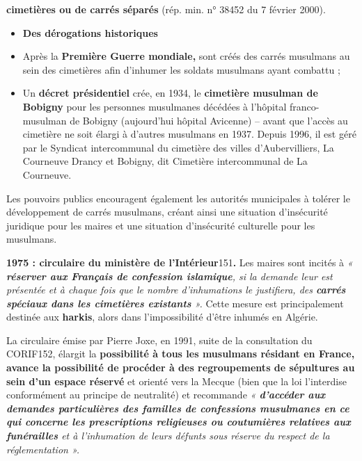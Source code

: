 \textbf{cimetières ou de carrés séparés} (rép. min. n° 38452 du 7
février 2000).


\begin{itemize}
\item
  \textbf{Des dérogations historiques}
\end{itemize}

\begin{itemize}
\item
  Après la \textbf{Première Guerre mondiale,} sont créés des carrés
  musulmans au sein des cimetières afin d'inhumer les soldats musulmans
  ayant combattu ;
\item
  Un \textbf{décret présidentiel} crée, en 1934, le \textbf{cimetière
  musulman de Bobigny} pour les personnes musulmanes décédées à
  l'hôpital franco-musulman de Bobigny (aujourd'hui hôpital Avicenne) --
  avant que l'accès au cimetière ne soit élargi à d'autres musulmans en
  1937. Depuis 1996, il est géré par le Syndicat intercommunal du
  cimetière des villes d'Aubervilliers, La Courneuve Drancy et Bobigny,
  dit Cimetière intercommunal de La Courneuve.
\end{itemize}


Les pouvoirs publics encouragent également les autorités municipales à
tolérer le développement de carrés musulmans, créant ainsi une situation
d'insécurité juridique pour les maires et une situation d'insécurité
culturelle pour les musulmans.

\textbf{1975 : circulaire du ministère de l'Intérieur}151\textbf{.} Les
maires sont incités à \emph{« \textbf{réserver aux Français de
confession islamique}, si la demande leur est présentée et à chaque fois
que le nombre d'inhumations le justifiera, des \textbf{carrés spéciaux
dans les cimetières existants} ».} Cette mesure est principalement
destinée aux \textbf{harkis}, alors dans l'impossibilité d'être inhumés
en Algérie.

La circulaire émise par Pierre Joxe, en 1991, suite de la consultation
du CORIF152, élargit la \textbf{possibilité à tous les musulmans
résidant en France, avance la possibilité de procéder à des
regroupements de sépultures au sein d'un espace réservé} et orienté vers
la Mecque (bien que la loi l'interdise conformément au principe de
neutralité) et recommande \emph{« \textbf{d'accéder aux demandes
particulières des familles de confessions musulmanes en ce qui concerne
les prescriptions religieuses ou coutumières relatives aux funérailles}
et à l'inhumation de leurs défunts sous réserve du respect de la
réglementation ».}

